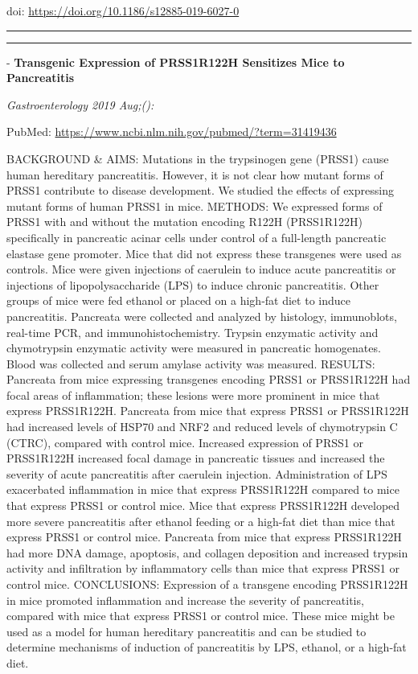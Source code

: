 \documentclass[]{article}
\begin{document}
doi: \url{https://doi.org/10.1186/s12885-019-6027-0}

{}

{}

\begin{center}\rule{0.5\linewidth}{\linethickness}\end{center}

\begin{center}\rule{0.5\linewidth}{\linethickness}\end{center}

 - \textbf{Transgenic Expression of PRSS1R122H Sensitizes Mice to
Pancreatitis}

\emph{Gastroenterology 2019 Aug;():}

PubMed: \url{https://www.ncbi.nlm.nih.gov/pubmed/?term=31419436}

BACKGROUND \& AIMS: Mutations in the trypsinogen gene (PRSS1) cause
human hereditary pancreatitis. However, it is not clear how mutant forms
of PRSS1 contribute to disease development. We studied the effects of
expressing mutant forms of human PRSS1 in mice. METHODS: We expressed
forms of PRSS1 with and without the mutation encoding R122H (PRSS1R122H)
specifically in pancreatic acinar cells under control of a full-length
pancreatic elastase gene promoter. Mice that did not express these
transgenes were used as controls. Mice were given injections of
caerulein to induce acute pancreatitis or injections of
lipopolysaccharide (LPS) to induce chronic pancreatitis. Other groups of
mice were fed ethanol or placed on a high-fat diet to induce
pancreatitis. Pancreata were collected and analyzed by histology,
immunoblots, real-time PCR, and immunohistochemistry. Trypsin enzymatic
activity and chymotrypsin enzymatic activity were measured in pancreatic
homogenates. Blood was collected and serum amylase activity was
measured. RESULTS: Pancreata from mice expressing transgenes encoding
PRSS1 or PRSS1R122H had focal areas of inflammation; these lesions were
more prominent in mice that express PRSS1R122H. Pancreata from mice that
express PRSS1 or PRSS1R122H had increased levels of HSP70 and NRF2 and
reduced levels of chymotrypsin C (CTRC), compared with control mice.
Increased expression of PRSS1 or PRSS1R122H increased focal damage in
pancreatic tissues and increased the severity of acute pancreatitis
after caerulein injection. Administration of LPS exacerbated
inflammation in mice that express PRSS1R122H compared to mice that
express PRSS1 or control mice. Mice that express PRSS1R122H developed
more severe pancreatitis after ethanol feeding or a high-fat diet than
mice that express PRSS1 or control mice. Pancreata from mice that
express PRSS1R122H had more DNA damage, apoptosis, and collagen
deposition and increased trypsin activity and infiltration by
inflammatory cells than mice that express PRSS1 or control mice.
CONCLUSIONS: Expression of a transgene encoding PRSS1R122H in mice
promoted inflammation and increase the severity of pancreatitis,
compared with mice that express PRSS1 or control mice. These mice might
be used as a model for human hereditary pancreatitis and can be studied
to determine mechanisms of induction of pancreatitis by LPS, ethanol, or
a high-fat diet.
\end{document}
